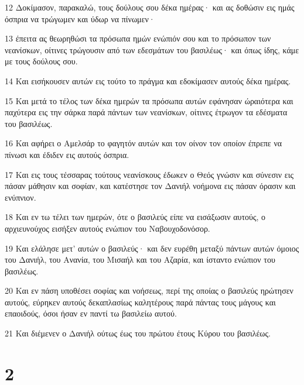 \par 12 Δοκίμασον, παρακαλώ, τους δούλους σου δέκα ημέρας· και ας δοθώσιν εις ημάς όσπρια να τρώγωμεν και ύδωρ να πίνωμεν·
\par 13 έπειτα ας θεωρηθώσι τα πρόσωπα ημών ενώπιόν σου και το πρόσωπον των νεανίσκων, οίτινες τρώγουσιν από των εδεσμάτων του βασιλέως· και όπως ίδης, κάμε με τους δούλους σου.
\par 14 Και εισήκουσεν αυτών εις τούτο το πράγμα και εδοκίμασεν αυτούς δέκα ημέρας.
\par 15 Και μετά το τέλος των δέκα ημερών τα πρόσωπα αυτών εφάνησαν ώραιότερα και παχύτερα εις την σάρκα παρά πάντων των νεανίσκων, οίτινες έτρωγον τα εδέσματα του βασιλέως.
\par 16 Και αφήρει ο Αμελσάρ το φαγητόν αυτών και τον οίνον τον οποίον έπρεπε να πίνωσι και έδιδεν εις αυτούς όσπρια.
\par 17 Και εις τους τέσσαρας τούτους νεανίσκους έδωκεν ο Θεός γνώσιν και σύνεσιν εις πάσαν μάθησιν και σοφίαν, και κατέστησε τον Δανιήλ νοήμονα εις πάσαν όρασιν και ενύπνιον.
\par 18 Και εν τω τέλει των ημερών, ότε ο βασιλεύς είπε να εισάξωσιν αυτούς, ο αρχιευνούχος εισήξεν αυτούς ενώπιον του Ναβουχοδονόσορ.
\par 19 Και ελάλησε μετ' αυτών ο βασιλεύς· και δεν ευρέθη μεταξύ πάντων αυτών όμοιος του Δανιήλ, του Ανανία, του Μισαήλ και του Αζαρία, και ίσταντο ενώπιον του βασιλέως.
\par 20 Και εν πάση υποθέσει σοφίας και νοήσεως, περί της οποίας ο βασιλεύς ηρώτησεν αυτούς, εύρηκεν αυτούς δεκαπλασίως καλητέρους παρά πάντας τους μάγους και επαοιδούς, όσοι ήσαν εν παντί τω βασιλείω αυτού.
\par 21 Και διέμενεν ο Δανιήλ ούτως έως του πρώτου έτους Κύρου του βασιλέως.

\chapter{2}

